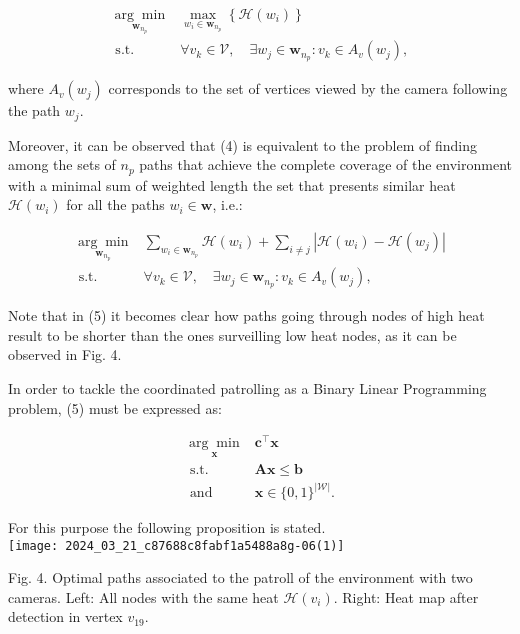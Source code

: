 \documentclass[conference]{IEEEtran}
\begin{document}
\begin{align*}
\underset{\mathbf{w}_{n_{p}}}{\arg \min } & \max _{w_{i} \in \mathbf{w}_{n_{p}}}\left\{\mathcal{H}\left(w_{i}\right)\right\}  \tag{4}\\
\text { s.t. } & \forall v_{k} \in \mathcal{V}, \quad \exists w_{j} \in \mathbf{w}_{n_{p}}: v_{k} \in A_{v}\left(w_{j}\right),
\end{align*}


where $A_{v}\left(w_{j}\right)$ corresponds to the set of vertices viewed by the camera following the path $w_{j}$.

Moreover, it can be observed that (4) is equivalent to the problem of finding among the sets of $n_{p}$ paths that achieve the complete coverage of the environment with a minimal sum of weighted length the set that presents similar heat $\mathcal{H}\left(w_{i}\right)$ for all the paths $w_{i} \in \mathbf{w}$, i.e.:


\begin{align*}
\underset{\mathbf{w}_{n_{p}}}{\arg \min } & \sum_{w_{i} \in \mathbf{w}_{n_{p}}} \mathcal{H}\left(w_{i}\right)+\sum_{i \neq j}\left|\mathcal{H}\left(w_{i}\right)-\mathcal{H}\left(w_{j}\right)\right|  \tag{5}\\
\text { s.t. } & \forall v_{k} \in \mathcal{V}, \quad \exists w_{j} \in \mathbf{w}_{n_{p}}: v_{k} \in A_{v}\left(w_{j}\right),
\end{align*}


Note that in (5) it becomes clear how paths going through nodes of high heat result to be shorter than the ones surveilling low heat nodes, as it can be observed in Fig. 4.

In order to tackle the coordinated patrolling as a Binary Linear Programming problem, (5) must be expressed as:


\begin{align*}
\underset{\mathbf{x}}{\arg \min } & \mathbf{c}^{\top} \mathbf{x} \\
\text { s.t. } & \mathbf{A x} \leq \mathbf{b}  \tag{6}\\
\text { and } & \mathbf{x} \in\{0,1\}^{|\mathcal{W}|} .
\end{align*}


For this purpose the following proposition is stated.\\
\texttt{[image: 2024\_03\_21\_c87688c8fabf1a5488a8g-06(1)]}

Fig. 4. Optimal paths associated to the patroll of the environment with two cameras. Left: All nodes with the same heat $\mathcal{H}\left(v_{i}\right)$. Right: Heat map after detection in vertex $v_{19}$.
\end{document}
